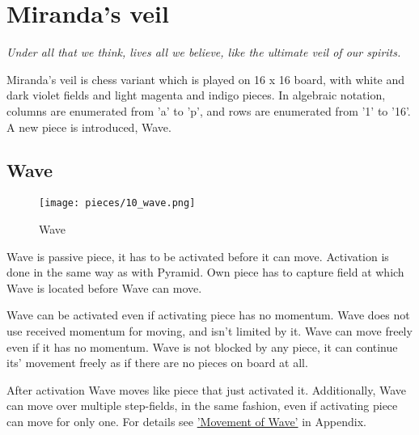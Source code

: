 
\chapter*{Miranda's veil}

\begin{flushright}
\parbox{0.8\textwidth}{
\emph{Under all that we think, lives all we believe, like the ultimate veil of our spirits. \\
 } }
\end{flushright}

\noindent
Miranda's veil is chess variant which is played on 16 x 16 board, with
white and dark violet fields and light magenta and indigo pieces. In
algebraic notation, columns are enumerated from 'a' to 'p', and rows
are enumerated from '1' to '16'. A new piece is introduced, Wave.

\clearpage %

\section*{Wave}

\noindent
\begin{wrapfigure}[12]{l}{0.4\textwidth}
\centering
\texttt{[image: pieces/10\_wave.png]}
\caption{Wave}
\label{fig:10_wave}
\end{wrapfigure}
Wave is passive piece, it has to be activated before it can move. Activation
is done in the same way as with Pyramid. Own piece has to capture field at
which Wave is located before Wave can move.

Wave can be activated even if activating piece has no momentum. Wave does not
use received momentum for moving, and isn't limited by it.
Wave can move freely even if it has no momentum. Wave is not blocked by any piece,
it can continue its' movement freely as if there are no pieces on board at all.

After activation Wave moves like piece that just activated it. Additionally,
Wave can move over multiple step-fields, in the same fashion, even if
activating piece can move for only one. For details see
\hyperref[sec:Appendix/Movement of Wave]{'Movement of Wave'} in Appendix.

